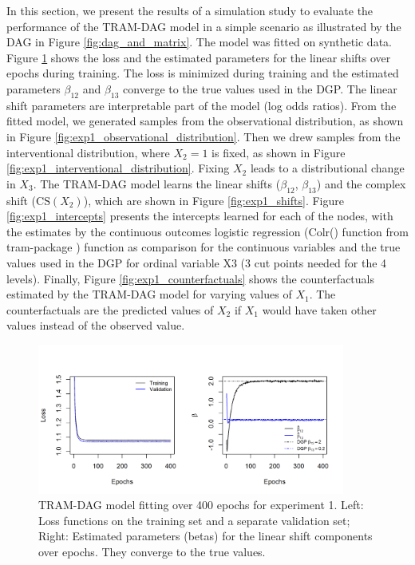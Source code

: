 In this section, we present the results of a simulation study to evaluate the performance of the TRAM-DAG model in a simple scenario as illustrated by the DAG in Figure \ref{fig:dag_and_matrix}. The model was fitted on synthetic data. Figure \ref{fig:exp1_loss_parameters} shows the loss and the estimated parameters for the linear shifts over epochs during training. The loss is minimized during training and the estimated parameters $\beta_{12}$ and $\beta_{13}$ converge to the true values used in the DGP. The linear shift parameters are interpretable part of the model (log odds ratios). 
From the fitted model, we generated samples from the observational distribution, as shown in Figure \ref{fig:exp1_observational_distribution}. Then we drew samples from the interventional distribution, where $X_2 = 1$ is fixed, as shown in Figure \ref{fig:exp1_interventional_distribution}. Fixing $X_2$ leads to a distributional change in $X_3$. The TRAM-DAG model learns the linear shifts ($\beta_{12}$, $\beta_{13}$) and the complex shift ($\text{CS}(X_2)$), which are shown in Figure \ref{fig:exp1_shifts}. Figure \ref{fig:exp1_intercepts} presents the intercepts learned for each of the nodes, with the estimates by the continuous outcomes logistic regression (Colr() function from tram-package \citep{hothorn2018}) function as comparison for the continuous variables and the true values used in the DGP for ordinal variable X3 (3 cut points needed for the 4 levels). Finally, Figure \ref{fig:exp1_counterfactuals} shows the counterfactuals estimated by the TRAM-DAG model for varying values of $X_1$. The counterfactuals are the predicted values of $X_2$ if $X_1$ would have taken other values instead of the observed value. 

\begin{figure}[htbp]
\centering
\includegraphics[width=0.9\textwidth]{img/exp1_loss_parameters.png}
\caption{TRAM-DAG model fitting over 400 epochs for experiment 1. Left: Loss functions on the training set and a separate validation set; Right: Estimated parameters (betas) for the linear shift components over epochs. They converge to the true values.}
\label{fig:exp1_loss_parameters}
\end{figure}



